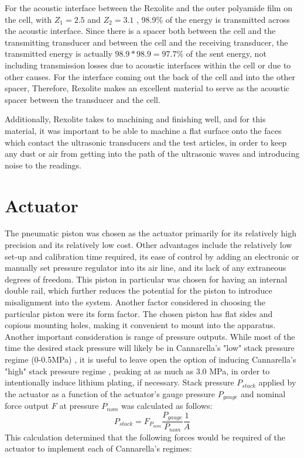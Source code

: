 For the acoustic interface between the Rexolite and the outer polyamide film on the cell, with $Z_1 = 2.5$ \cite{REXOLITE} and $Z_2 = 3.1$ \cite{OLYMPUS}, 98.9\% of the energy is transmitted across the acoustic interface. Since there is a spacer both between the cell and the transmitting transducer and between the cell and the receiving transducer, the transmitted energy is actually $98.9*98.9 = 97.7\%$ of the sent energy, not including transmission losses due to acoustic interfaces within the cell or due to other causes. For the interface coming out the back of the cell and into the other spacer,  Therefore, Rexolite makes an excellent material to serve as the acoustic spacer between the transducer and the cell. 

Additionally, Rexolite takes to machining and finishing well, and for this material, it was important to be able to machine a flat surface onto the faces which contact the ultrasonic transducers and the test articles, in order to keep any dust or air from getting into the path of the ultrasonic waves and introducing noise to the readings.
 
\section{Actuator}
The pneumatic piston was chosen as the actuator primarily for its relatively high precision and its relatively low cost. Other advantages include the relatively low set-up and calibration time required, its ease of control by adding an electronic or manually set pressure regulator into its air line, and its lack of any extraneous degrees of freedom. This piston in particular was chosen for having an internal double rail, which further reduces the potential for the piston to introduce misalignment into the system. Another factor considered in choosing the particular piston were its form factor. The chosen piston has flat sides and copious mounting holes, making it convenient to mount into the apparatus. Another important consideration is range of pressure outputs. While most of the time the desired stack pressure will likely be in Cannarella's "low" stack pressure regime (0-0.5MPa) \cite{STACK-STRESS}, it is useful to leave open the option of inducing Cannarella's "high" stack pressure regime \cite{STACK-STRESS}, peaking at as much as 3.0 MPa, in order to intentionally induce lithium plating, if necessary.
Stack pressure $P_{stack}$ applied by the actuator as a function of the actuator's gauge pressure $P_{gauge}$ and nominal force output $F$ at pressure $P_{nom}$ was calculated as follows:
$$P_{stack} = F_{P_{nom}}\frac{P_{gauge}}{P_{nom}}\frac{1}{A} $$
This calculation determined that the following forces would be required of the actuator to implement each of Cannarella's regimes:

